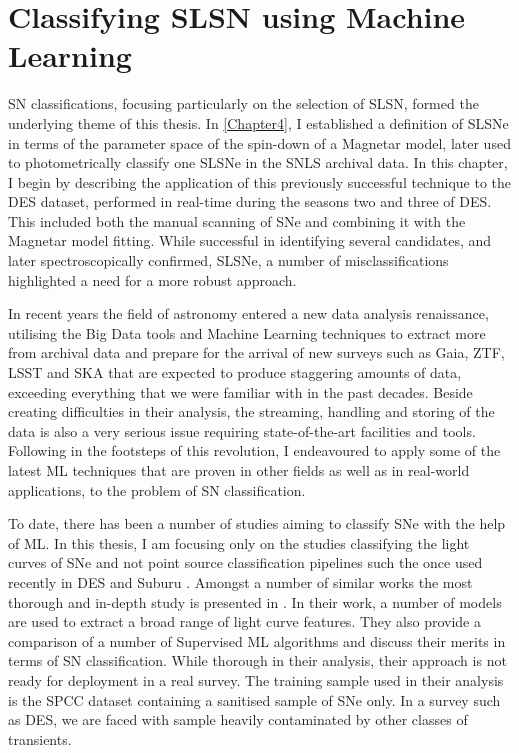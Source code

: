 \chapter{Classifying SLSN using Machine Learning}
\label{Chapter5}

SN classifications, focusing particularly on the selection of SLSN, formed the underlying theme of this thesis. In \cref{Chapter4}, I established a definition of SLSNe in terms of the parameter space of the spin-down of a Magnetar model, later used to photometrically classify one SLSNe in the SNLS archival data. In this chapter, I begin by describing the application of this previously successful technique to the DES dataset, performed in real-time during the seasons two and three of DES. This included both the manual scanning of SNe and combining it with the Magnetar model fitting. While successful in identifying several candidates, and later spectroscopically confirmed, SLSNe, a number of misclassifications highlighted a need for a more robust approach.

In recent years the field of astronomy entered a new data analysis renaissance, utilising the Big Data tools and Machine Learning techniques to extract more from archival data and prepare for the arrival of new surveys such as Gaia, ZTF, LSST and SKA that are expected to produce staggering amounts of data, exceeding everything that we were familiar with in the past decades. Beside creating difficulties in their analysis, the streaming, handling and storing of the data is also a very serious issue requiring state-of-the-art facilities and tools. Following in the footsteps of this revolution, I endeavoured to apply some of the latest ML techniques that are proven in other fields as well as in real-world applications, to the problem of SN classification.

To date, there has been a number of studies aiming to classify SNe with the help of ML. In this thesis, I am focusing only on the studies classifying the light curves of SNe and not point source classification pipelines such the once used recently in DES \citep{Goldstein2015} and Suburu \citep{Morii2016}. Amongst a number of similar works \citep{Karpenka2012,Moller2016,Charnock2016} the most thorough and in-depth study is presented in \citet{Lochner2016}. In their work, a number of models are used to extract a broad range of light curve features. They also provide a comparison of a number of Supervised ML algorithms and discuss their merits in terms of SN classification. While thorough in their analysis, their approach is not ready for deployment in a real survey. The training sample used in their analysis is the SPCC dataset containing a sanitised sample of SNe only. In a survey such as DES, we are faced with sample heavily contaminated by other classes of transients.

